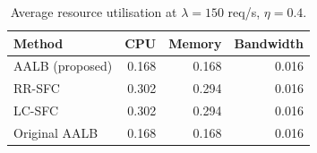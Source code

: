\begin{table}[t]
\centering
\caption{Average resource utilisation at $\lambda=150$ req/s, $\eta=0.4$.}
\label{tab:utilization}
\begin{tabular}{lrrr}
\toprule
Method & CPU & Memory & Bandwidth \\
\midrule
AALB (proposed) & 0.168 & 0.168 & 0.016 \\
RR-SFC & 0.302 & 0.294 & 0.016 \\
LC-SFC & 0.302 & 0.294 & 0.016 \\
Original AALB & 0.168 & 0.168 & 0.016 \\
\bottomrule
\end{tabular}
\end{table}